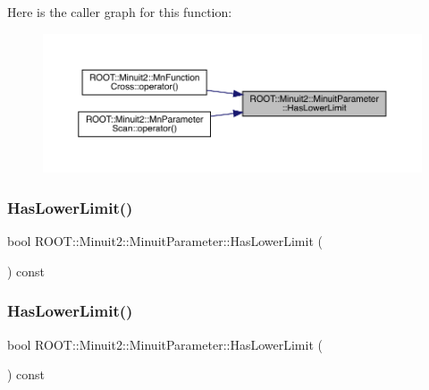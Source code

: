 Here is the caller graph for this function\+:
\nopagebreak
\begin{figure}[H]
\begin{center}
\leavevmode
\includegraphics[width=350pt]{dd/dfb/classROOT_1_1Minuit2_1_1MinuitParameter_a61b9c27aff1b1d7bf85bed898dd50dda_icgraph}
\end{center}
\end{figure}
\mbox{\label{classROOT_1_1Minuit2_1_1MinuitParameter_a61b9c27aff1b1d7bf85bed898dd50dda}} 
\subsubsection{\texorpdfstring{HasLowerLimit()}{HasLowerLimit()}\hspace{0.1cm}{\footnotesize\ttfamily [2/3]}}
{\footnotesize\ttfamily bool R\+O\+O\+T\+::\+Minuit2\+::\+Minuit\+Parameter\+::\+Has\+Lower\+Limit (\begin{DoxyParamCaption}{ }\end{DoxyParamCaption}) const\hspace{0.3cm}{\ttfamily [inline]}}

\mbox{\label{classROOT_1_1Minuit2_1_1MinuitParameter_a61b9c27aff1b1d7bf85bed898dd50dda}} 
\subsubsection{\texorpdfstring{HasLowerLimit()}{HasLowerLimit()}\hspace{0.1cm}{\footnotesize\ttfamily [3/3]}}
{\footnotesize\ttfamily bool R\+O\+O\+T\+::\+Minuit2\+::\+Minuit\+Parameter\+::\+Has\+Lower\+Limit (\begin{DoxyParamCaption}{ }\end{DoxyParamCaption}) const\hspace{0.3cm}{\ttfamily [inline]}}

